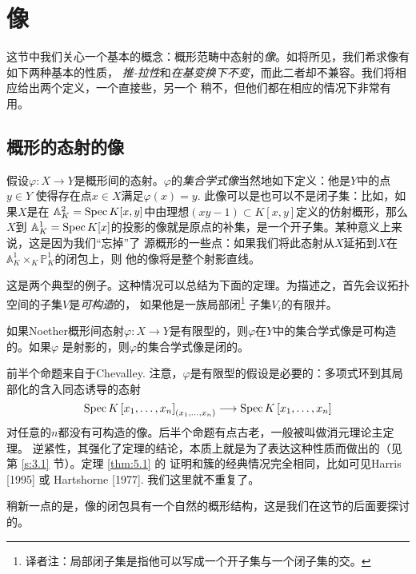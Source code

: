 \section{像}\label{s:4.1}


这节中我们关心一个基本的概念：概形范畴中态射的\textit{像}。如将所见，我们希求像有如下两种基本的性质，
\textit{推-拉性}和\textit{在基变换下不变}，而此二者却不兼容。我们将相应给出两个定义，一个直接些，另一个
稍不，但他们都在相应的情况下非常有用。

\subsection{概形的态射的像}\label{s:4.1.1}

假设$\varphi:X\to Y$是概形间的态射。$\varphi$的\textit{集合学式像}当然地如下定义：他是$Y$中的点$y\in Y$
使得存在点$x\in X$满足$\varphi(x)=y$. 此像可以是也可以不是闭子集：比如，如果$X$是在
$\mathbb{A}_K^2=\operatorname{Spec} K[x, y]$中由理想$(xy-1)\subset K[x,y]$定义的仿射概形，那么$X$到
$\mathbb{A}_K^1=\operatorname{Spec} K[x]$的投影的像就是原点的补集，是一个开子集。某种意义上来说，这是因为我们“忘掉”了
源概形的一些点：如果我们将此态射从$X$延拓到$X$在$\mathbb{A}_K^1 \times_K \mathbb{P}_K^1$的闭包上，则
他的像将是整个射影直线。

这是两个典型的例子。这种情况可以总结为下面的定理。为描述之，首先会议拓扑空间的子集$V$是\textit{可构造}的，
如果他是一族局部闭\footnote{译者注：局部闭子集是指他可以写成一个开子集与一个闭子集的交。}%
子集$V_i$的有限并。


\begin{thm}\label{thm:5.1}
    如果Noether概形间态射$\varphi: X\to Y$是有限型的，则$\varphi$在$Y$中的集合学式像是可构造的。如果$\varphi$
    是射影的，则$\varphi$的集合学式像是闭的。
\end{thm}

前半个命题来自于Chevalley. 注意，$\varphi$是有限型的假设是必要的：多项式环到其局部化的含入同态诱导的态射
\[
    \operatorname{Spec} K\left[x_1, \ldots, x_n\right]_{\left(x_1, \ldots, x_n\right)} \longrightarrow 
    \operatorname{Spec} K\left[x_1, \ldots, x_n\right]
\]
对任意的$n$都没有可构造的像。后半个命题有点古老，一般被叫做消元理论主定理。
逆紧性，其强化了定理的结论，本质上就是为了表达这种性质而做出的（见第 \ref{s:3.1} 节）。定理 \ref{thm:5.1} 的
证明和簇的经典情况完全相同，比如可见Harris [1995] 或 Hartshorne [1977]. 我们这里就不重复了。

稍新一点的是，像的闭包具有一个自然的概形结构，这是我们在这节的后面要探讨的。

